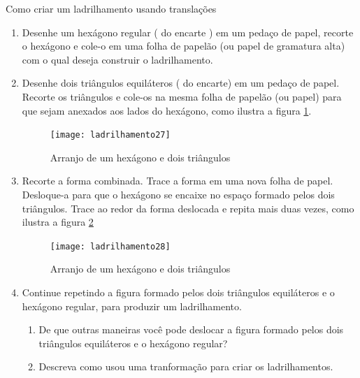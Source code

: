 \begin{task}{Como criar um ladrilhamento usando translações}

\begin{enumerate}
	\item Desenhe um hexágono regular ( do encarte ) em um pedaço de papel, recorte o hexágono e cole-o em uma folha de papelão (ou papel de gramatura  alta) com o qual deseja construir o ladrilhamento.
	\item Desenhe dois triângulos equiláteros ( do encarte) em um pedaço de papel. Recorte os triângulos e cole-os na mesma folha de papelão (ou papel) para que sejam anexados aos lados do hexágono, como ilustra a figura \ref{transf1}.

	\begin{figure}[H]
	\centering
	\texttt{[image: ladrilhamento27]}
	\label{transf1}
\caption{Arranjo de um hexágono e dois triângulos}
	\end{figure}

	\item Recorte a forma combinada. Trace a forma em uma nova folha de papel. Desloque-a para que o hexágono se encaixe no espaço formado pelos dois triângulos. Trace ao redor da forma deslocada e repita mais duas vezes, como ilustra a figura \ref{transf2}

	\begin{figure}[H]
	\centering
	\texttt{[image: ladrilhamento28]}
	\label{transf2}
\caption{Arranjo de um hexágono e dois triângulos}
	\end{figure}
	
\item Continue repetindo a figura formado pelos dois triângulos equiláteros e o hexágono regular, para produzir um ladrilhamento.	
	
	\begin{enumerate}
		\item De que outras maneiras você pode deslocar a figura formado pelos dois triângulos equiláteros e o hexágono regular?
		
	\item Descreva como usou uma tranformação para criar os ladrilhamentos.

\end{enumerate}
\end{enumerate}
\end{task}

